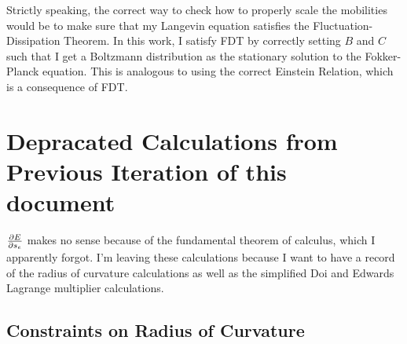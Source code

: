 \documentclass[12pt]{article}
\begin{document}
Strictly speaking, the correct way to check how to properly scale the mobilities would be to make sure that my Langevin equation satisfies the Fluctuation-Dissipation Theorem. In this work, I satisfy FDT by correctly setting $B$ and $C$ such that I get a Boltzmann distribution as the stationary solution to the Fokker-Planck equation. This is analogous to using the correct Einstein Relation, which is a consequence of  FDT. 

\section{Depracated Calculations from Previous Iteration of this document}
$\pdv{E}{s_e}$ makes no sense because of the fundamental theorem of calculus, which I apparently forgot. I'm leaving these calculations because I want to have a record of the radius of curvature calculations as well as the simplified Doi and Edwards Lagrange multiplier calculations.

\subsection{Constraints on Radius of Curvature}
\end{document}
